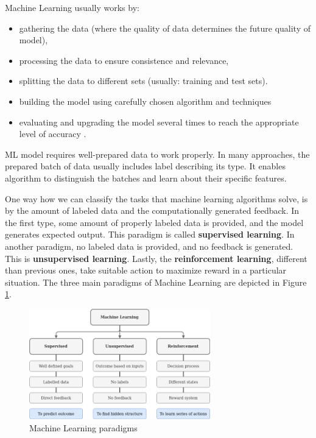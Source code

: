 \documentclass[../Main.tex]{subfiles}
\begin{document}
    Machine Learning usually works by:
    \begin{itemize}
        \item gathering the data (where the quality of data determines the future quality of model), 
        \item processing the data to ensure consistence and relevance, 
        \item splitting the data to different sets (usually: training and test sets). 
        \item building the model using carefully chosen algorithm and techniques 
        \item evaluating and upgrading the model several times to reach the appropriate level of accuracy \cite{deepai}. 
    \end{itemize}
    
    ML model requires well-prepared data to work properly. In many approaches, the prepared batch of data usually includes label describing its type. It enables algorithm to distinguish the batches and learn about their specific features. 

    One way how we can classify the tasks that machine learning algorithms solve, is by the amount of labeled data and the computationally generated feedback. In the first type, some amount of properly labeled data is provided, and the model generates expected output. This paradigm is called \textbf{supervised learning}. 
    In another paradigm, no labeled data is provided, and no feedback is generated. This is  \textbf{unsupervised learning}. Lastly, the \textbf{reinforcement learning}, different than previous ones, take suitable action to maximize reward in a particular situation. The three main paradigms of Machine Learning are depicted in Figure \ref{fig:ML-paradigms}. \\
    \begin{figure}[ht]
        \centering
        \includegraphics[width=0.7\textwidth]{Images/02_ml_paradigms.png}
        \caption{Machine Learning paradigms}
        \label{fig:ML-paradigms}
    \end{figure}
\end{document}
